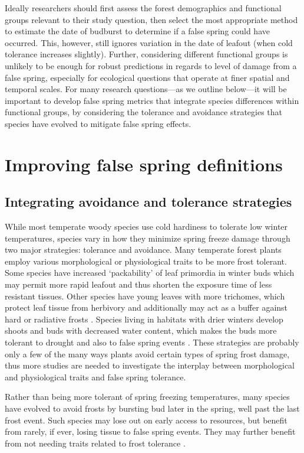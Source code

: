 \documentclass{article}\usepackage[]{graphicx}\usepackage[]{color}
\begin{document}
Ideally researchers should first assess the forest demographics and functional groups relevant to their study question, then select the most appropriate method to estimate the date of budburst to determine if a false spring could have occurred. This, however, still ignores variation in the date of leafout (when cold tolerance increases slightly). Further, considering different functional groups is unlikely to be enough for robust predictions in regards to level of damage from a false spring, especially for ecological questions that operate at finer spatial and temporal scales. For many research questions---as we outline below---it will be important to develop false spring metrics that integrate species differences within functional groups, by considering the tolerance and avoidance strategies that species have evolved to mitigate false spring effects. 

\section*{Improving false spring definitions}
\subsection*{Integrating avoidance and tolerance strategies}
While most temperate woody species use cold hardiness to tolerate low winter temperatures, species vary in how they minimize spring freeze damage through two major strategies: tolerance and avoidance. Many temperate forest plants employ various morphological or physiological traits to be more frost tolerant. Some species have increased `packability' of leaf primordia in winter buds which may permit more rapid leafout \citep{Edwards2017} and thus shorten the exposure time of less resistant tissues. Other species have young leaves with more trichomes, which protect leaf tissue from herbivory and additionally may act as a buffer against hard or radiative frosts \citep{Agrawal2004, Prozherina2003}. Species living in habitats with drier winters develop shoots and buds with decreased water content, which makes the buds more tolerant to drought and also to false spring events \citep{Beck2007, Hofmann2015, Kathke2011, Morin2007,  Muffler2016, Nielsen2009, Poirier2010}. These strategies are probably only a few of the many ways plants avoid certain types of spring frost damage, thus more studies are needed to investigate the interplay between morphological and physiological traits and false spring tolerance. 

Rather than being more tolerant of spring freezing temperatures, many species have evolved to avoid frosts by bursting bud later in the spring, well past the last frost event. Such species may lose out on early access to resources, but benefit from rarely, if ever, losing tissue to false spring events. They may further benefit from not needing traits related to frost tolerance \citep{Lenz2013}. 
\end{document}
